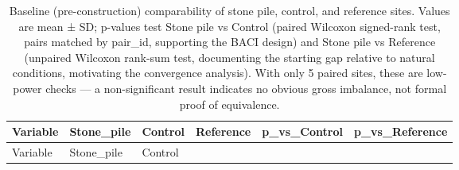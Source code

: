 \documentclass[
  12pt,
  a4paper,
  oneside]{scrbook}
\begin{document}
\begin{longtable}[]{@{}
  >{\raggedright\arraybackslash}p{}
  >{\raggedright\arraybackslash}p{}
  >{\raggedright\arraybackslash}p{}
  >{\raggedright\arraybackslash}p{}
  >{\raggedleft\arraybackslash}p{}
  >{\raggedleft\arraybackslash}p{}@{}}
\caption{Baseline (pre-construction) comparability of stone pile,
control, and reference sites. Values are mean ± SD; p-values test Stone
pile vs Control (paired Wilcoxon signed-rank test, pairs matched by
pair\_id, supporting the BACI design) and Stone pile vs Reference
(unpaired Wilcoxon rank-sum test, documenting the starting gap relative
to natural conditions, motivating the convergence analysis). With only 5
paired sites, these are low-power checks --- a non-significant result
indicates no obvious gross imbalance, not formal proof of
equivalence.}\tabularnewline
\toprule\noalign{}
\begin{minipage}[b]{\linewidth}\raggedright
Variable
\end{minipage} & \begin{minipage}[b]{\linewidth}\raggedright
Stone\_pile
\end{minipage} & \begin{minipage}[b]{\linewidth}\raggedright
Control
\end{minipage} & \begin{minipage}[b]{\linewidth}\raggedright
Reference
\end{minipage} & \begin{minipage}[b]{\linewidth}\raggedleft
p\_vs\_Control
\end{minipage} & \begin{minipage}[b]{\linewidth}\raggedleft
p\_vs\_Reference
\end{minipage} \\
\midrule\noalign{}
\endfirsthead
\toprule\noalign{}
\begin{minipage}[b]{\linewidth}\raggedright
Variable
\end{minipage} & \begin{minipage}[b]{\linewidth}\raggedright
Stone\_pile
\end{minipage} & \begin{minipage}[b]{\linewidth}\raggedright
Control
\end{minipage} & \begin{minipage}[b]{\linewidth}\raggedright

\end{minipage}
\end{longtable}
\end{document}
